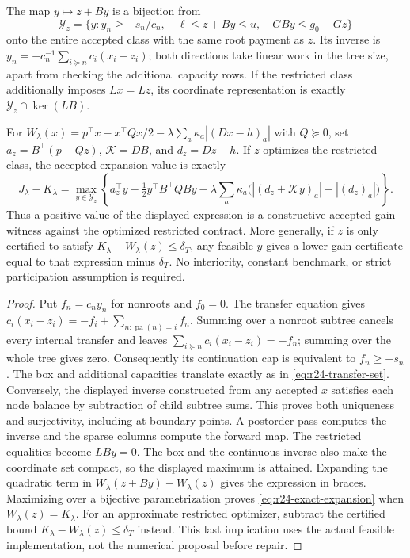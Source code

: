 \begin{theorem}\label{thm:r24-transfers}
The map $y\mapsto z+By$ is a bijection from
\begin{equation}\label{eq:r24-transfer-set}
 \mathcal Y_z=\{y:y_n\geq-s_n/c_n,\quad
       \ell\leq z+By\leq u,\quad GBy\leq g_0-Gz\}
\end{equation}
onto the entire accepted class with the same root payment as $z$.
Its inverse is
$y_n=-c_n^{-1}\sum_{i\succeq n}c_i(x_i-z_i)$; both directions take linear
work in the tree size, apart from checking the additional capacity rows.
If the restricted class additionally imposes $Lx=Lz$, its coordinate
representation is exactly $\mathcal Y_z\cap\ker(LB)$.

For
$W_\lambda(x)=p^\top x-x^\top Qx/2-\lambda\sum_a\kappa_a|(Dx-h)_a|$
with $Q\succeq0$, set $a_z=B^\top(p-Qz)$, $\mathcal K=DB$, and $d_z=Dz-h$.
If $z$ optimizes the restricted class, the accepted expansion value is exactly
\begin{equation}\label{eq:r24-exact-expansion}
 J_\lambda-K_\lambda
 =\max_{y\in\mathcal Y_z}\left\{
 a_z^\top y-\tfrac12y^\top B^\top QB y
 -\lambda\sum_a\kappa_a\bigl(|(d_z+\mathcal Ky)_a|-|(d_z)_a|\bigr)\right\}.
\end{equation}
Thus a positive value of the displayed expression is a constructive accepted
gain witness against the optimized restricted contract. More generally, if
$z$ is only certified to satisfy $K_\lambda-W_\lambda(z)\leq\delta_T$,
any feasible $y$ gives a lower gain certificate equal to that expression minus
$\delta_T$. No interiority, constant benchmark, or strict participation
assumption is required.
\end{theorem}
\begin{proof}
Put $f_n=c_n y_n$ for nonroots and $f_0=0$. The transfer equation gives
$c_i(x_i-z_i)=-f_i+\sum_{n:\operatorname{pa}(n)=i}f_n$.
Summing over a nonroot subtree cancels every internal transfer and leaves
$\sum_{i\succeq n}c_i(x_i-z_i)=-f_n$; summing over the whole tree gives zero.
Consequently its continuation cap is equivalent to $f_n\geq-s_n$.
The box and additional capacities translate exactly as in
\eqref{eq:r24-transfer-set}. Conversely, the displayed inverse constructed
from any accepted $x$ satisfies each node balance by subtraction of child
subtree sums. This proves both uniqueness and surjectivity, including at
boundary points. A postorder pass computes the inverse and the sparse columns
compute the forward map. The restricted equalities become $LBy=0$.
The box and the continuous inverse also make the coordinate set compact, so the displayed maximum is attained. Expanding the quadratic term in $W_\lambda(z+By)-W_\lambda(z)$ gives the
expression in braces. Maximizing over a bijective parametrization proves
\eqref{eq:r24-exact-expansion} when $W_\lambda(z)=K_\lambda$.
For an approximate restricted optimizer, subtract the certified bound
$K_\lambda-W_\lambda(z)\leq\delta_T$ instead. This last implication uses the
actual feasible implementation, not the numerical proposal before repair.
\end{proof}

